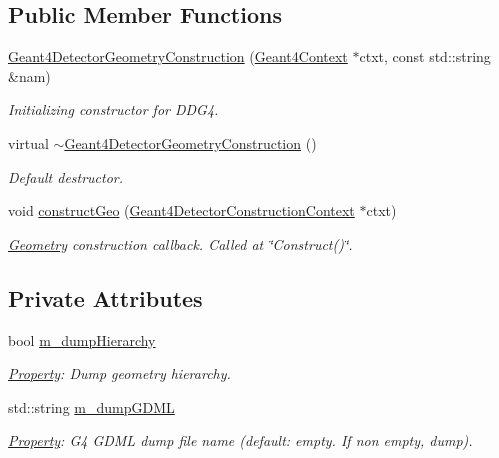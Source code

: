\subsection*{Public Member Functions}
\begin{DoxyCompactItemize}
\item 
\hyperlink{class_d_d4hep_1_1_simulation_1_1_geant4_detector_geometry_construction_a7de5c95809423c7c96d5ce0fa2b275de}{Geant4DetectorGeometryConstruction} (\hyperlink{class_d_d4hep_1_1_simulation_1_1_geant4_context}{Geant4Context} $\ast$ctxt, const std::string \&nam)
\begin{DoxyCompactList}\small\item\em Initializing constructor for DDG4. \item\end{DoxyCompactList}\item 
virtual \hyperlink{class_d_d4hep_1_1_simulation_1_1_geant4_detector_geometry_construction_ad0f9d21253bd2cf44ce3ce56b52838b7}{$\sim$Geant4DetectorGeometryConstruction} ()
\begin{DoxyCompactList}\small\item\em Default destructor. \item\end{DoxyCompactList}\item 
void \hyperlink{class_d_d4hep_1_1_simulation_1_1_geant4_detector_geometry_construction_ab20b86bfe9009f93ce567ef418e266af}{constructGeo} (\hyperlink{class_d_d4hep_1_1_simulation_1_1_geant4_detector_construction_context}{Geant4DetectorConstructionContext} $\ast$ctxt)
\begin{DoxyCompactList}\small\item\em \hyperlink{namespace_d_d4hep_1_1_geometry}{Geometry} construction callback. Called at \char`\"{}Construct()\char`\"{}. \item\end{DoxyCompactList}\end{DoxyCompactItemize}
\subsection*{Private Attributes}
\begin{DoxyCompactItemize}
\item 
bool \hyperlink{class_d_d4hep_1_1_simulation_1_1_geant4_detector_geometry_construction_ac003c6513973e596d5d214206c3f8d99}{m\_\-dumpHierarchy}
\begin{DoxyCompactList}\small\item\em \hyperlink{class_d_d4hep_1_1_property}{Property}: Dump geometry hierarchy. \item\end{DoxyCompactList}\item 
std::string \hyperlink{class_d_d4hep_1_1_simulation_1_1_geant4_detector_geometry_construction_abb2b35066d2a33cd98aaf1d960ce60cc}{m\_\-dumpGDML}
\begin{DoxyCompactList}\small\item\em \hyperlink{class_d_d4hep_1_1_property}{Property}: G4 GDML dump file name (default: empty. If non empty, dump). \item\end{DoxyCompactList}\end{DoxyCompactItemize}


